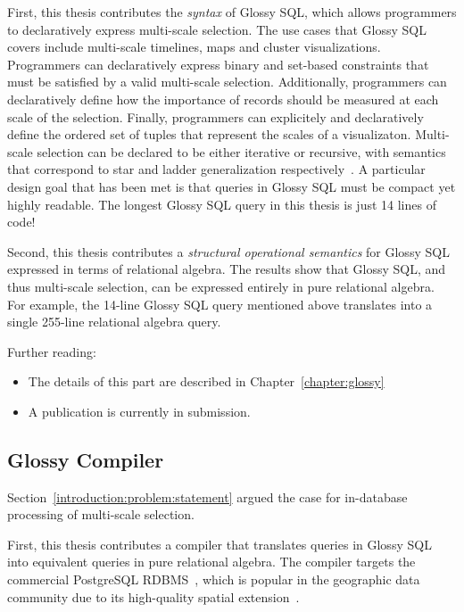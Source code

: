 \documentclass[11pt, oneside]{report}
\begin{document}
First, this thesis contributes the \emph{syntax} of Glossy SQL, which allows programmers to declaratively express multi-scale selection. The use cases that Glossy SQL covers include multi-scale timelines, maps and cluster visualizations. Programmers can declaratively express binary and set-based constraints that must be satisfied by a valid multi-scale selection. Additionally, programmers can declaratively define how the importance of records should be measured at each scale of the selection. Finally, programmers can explicitely and declaratively define the ordered set of tuples that represent the scales of a visualizaton. Multi-scale selection can be declared to be either iterative or recursive, with semantics that  correspond to star and ladder generalization respectively~\cite{foerster2010challenges}. A particular design goal that has been met is that queries in Glossy SQL must be compact yet highly readable. The longest Glossy SQL query in this thesis is just 14 lines of code!

Second, this thesis contributes a \emph{structural operational semantics} for Glossy SQL expressed in terms of relational algebra. The results show that Glossy SQL, and thus multi-scale selection, can be expressed entirely in pure relational algebra. For example, the 14-line Glossy SQL query mentioned above translates into a single 255-line relational algebra query.

Further reading:

\vspace{-2ex}
\begin{itemize}
\item The details of this part are described in Chapter~\ref{chapter:glossy}
\item A publication is currently in submission.
\end{itemize}

\subsection{Glossy Compiler}
\label{sec:introduction:contributions:glossy}

Section~\ref{introduction:problem:statement} argued the case for in-database processing of multi-scale selection.

First, this thesis contributes a compiler that translates queries in Glossy SQL into equivalent queries in pure relational algebra. The compiler targets the commercial PostgreSQL RDBMS~\cite{PostgreSQL}, which is popular in the geographic data community due to its high-quality spatial extension~\cite{PostGIS}.
\end{document}
